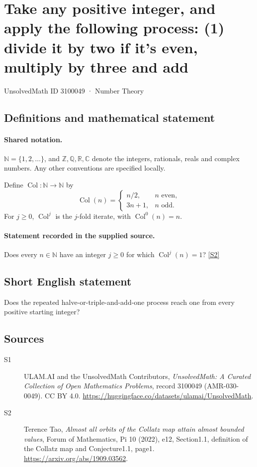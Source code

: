 \documentclass[11pt]{article}
\newcommand{\sref}[2]{\hyperlink{source:#1:#2}{[S#2]}}
\begin{document}
\setcounter{section}{3100048}
\section{Take any positive integer, and apply the following process: (1) divide it by two if it's even, multiply by three and add}\label{3100049}
{\small\sffamily UnsolvedMath ID 3100049 · Number Theory}
\subsection{Definitions and mathematical statement}

\paragraph{Shared notation.}$\mathbb N=\{1,2,\ldots\}$, and $\mathbb Z,\mathbb Q,\mathbb R,\mathbb C$ denote the integers, rationals, reals and complex numbers. Any other conventions are specified locally.


Define $\operatorname{Col}:\mathbb N\to\mathbb N$ by
\[\operatorname{Col}(n)=\begin{cases}n/2,&n\text{ even},\\3n+1,&n\text{ odd}.\end{cases}\]
For $j\ge0$, $\operatorname{Col}^j$ is the $j$-fold iterate, with $\operatorname{Col}^0(n)=n$.

\paragraph{Statement recorded in the supplied source.}
Does every $n\in\mathbb N$ have an integer $j\ge0$ for which $\operatorname{Col}^j(n)=1$? \sref{3100049}{2}

\subsection{Short English statement}
Does the repeated halve-or-triple-and-add-one process reach one from every positive starting integer?
\subsection{Sources}
\begin{description}
\item[\hypertarget{source:3100049:1}{S1}] ULAM.AI and the UnsolvedMath Contributors, \emph{UnsolvedMath: A Curated Collection of Open Mathematics Problems}, record 3100049 (AMR-030-0049). CC BY 4.0. \url{https://huggingface.co/datasets/ulamai/UnsolvedMath}.
\item[\hypertarget{source:3100049:2}{S2}] Terence Tao, \emph{Almost all orbits of the Collatz map attain almost bounded values}, Forum of Mathematics, Pi 10 (2022), e12, Section1.1, definition of the Collatz map and Conjecture1.1, page1. \url{https://arxiv.org/abs/1909.03562}.
\end{description}
\label{end:3100049}
\end{document}
